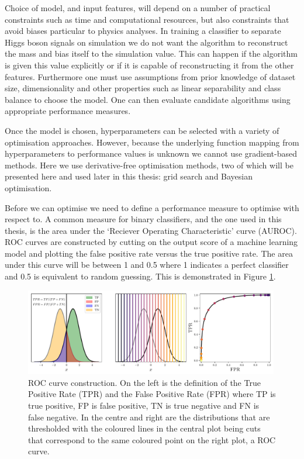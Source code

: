 Choice of model, and input features, will depend on a number of practical constraints such as time and computational resources, but also constraints that avoid biases particular to physics analyses. 
In training a classifier to separate Higgs boson signals on simulation we do not want the algorithm to reconstruct the mass and bias itself to the simulation value. This can happen if the algorithm is given this value explicitly or if it is capable of reconstructing it from the other features.  
Furthermore one must use assumptions from prior knowledge of dataset size, dimensionality and other properties such as linear separability and class balance to choose the model. One can then evaluate candidate algorithms using appropriate performance measures. 


Once the model is chosen, hyperparameters can be selected with a variety of optimisation approaches. However, because the underlying function mapping from hyperparameters to performance values is unknown we cannot use gradient-based methods. Here we use derivative-free optimisation methods, two of which will be presented here and used later in this thesis: grid search and Bayesian optimisation. 

Before we can optimise we need to define a performance measure to optimise with respect to. A common measure for binary classifiers, and the one used in this thesis, is the area under the `Reciever Operating Characteristic' curve (AUROC).
ROC curves are constructed by cutting on the output score of a machine learning model and plotting the false positive rate versus the true positive rate. The area under this curve will be between 1 and 0.5 where 1 indicates a perfect classifier and 0.5 is equivalent to random guessing. This is demonstrated in Figure \ref{fig:machine_learning:ROC_curve}. 
\begin{figure}[h!]
    \begin{center}
        \includegraphics[width=0.99\textwidth]{figures/machine_learning/ROC_figure.pdf}
    \end{center}
    \caption{ROC curve construction. On the left is the definition of the True Positive Rate (TPR) and the False Positive Rate (FPR) where TP is true positive, FP is false positive, TN is true negative and FN is false negative. In the centre and right are the distributions that are thresholded with the coloured lines in the central plot being cuts that correspond to the same coloured point on the right plot, a ROC curve. }
        \label{fig:machine_learning:ROC_curve}
\end{figure}


